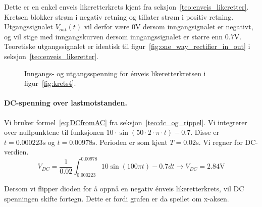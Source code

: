 Dette er en enkel enveis likeretterkrets kjent fra seksjon~\ref{teo:enveis_likeretter}. Kretsen blokker strøm i negativ retning og tillater strøm i positiv retning. Utgangssignalet $V_{out}(t)$ vil derfor være 0V dersom inngangsignalet er negativt, og vil stige med inngangskurven dersom inngangssignalet er større enn 0.7V. Teoretiske utgangssignalet er identisk til figur~\ref{fig:one_way_rectifier_in_out} i seksjon~\ref{teo:enveis_likeretter}.

\begin{figure}[H]
\centering
{}
\caption{Inngangs- og utgangsspenning for énveis likeretterkretsen i figur~\ref{fig:krets4}.}\label{fig:krets4_in_out}
\end{figure}

\paragraph{DC-spenning over lastmotstanden. } Vi bruker formel~\ref{eq:DCfromAC} fra seksjon~\ref{teo:dc_og_rippel}. Vi integrerer over nullpunktene til funksjonen $10\cdot \sin (50\cdot 2 \cdot \pi \cdot t) - 0.7$. Disse er $t = 0.000223\text{s}$ og $t = 0.00978\text{s}$. Perioden er som kjent $T = 0.02$s. Vi regner for DC-verdien.
\[
V_{DC} = \frac{1}{0.02}\int_{0.000223}^{0.00978} 10\sin (100\pi t) - 0.7  dt \rightarrow V_{DC} = 2.84\text{V}
\]

\noindent
Dersom vi flipper dioden for å oppnå en negativ énveis likeretterkrets, vil DC spenningen skifte fortegn. Dette er fordi grafen er da speilet om x-aksen.





